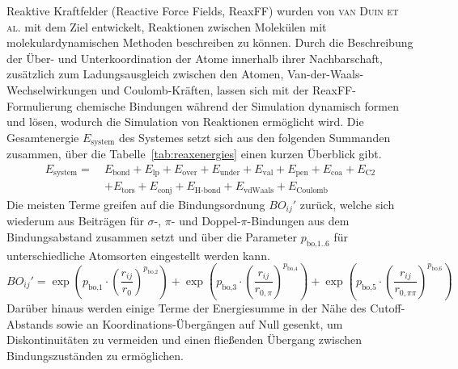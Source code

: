 Reaktive Kraftfelder (Reactive Force Fields, ReaxFF) wurden von \textsc{van Duin et al.}\cite{van_duin_reaxff:_2001} mit dem Ziel entwickelt, Reaktionen zwischen Molekülen mit molekulardynamischen Methoden beschreiben zu können.
Durch die Beschreibung der Über- und Unterkoordination der Atome innerhalb ihrer Nachbarschaft, zusätzlich zum Ladungsausgleich zwischen den Atomen, Van-der-Waals-Wechselwirkungen und Coulomb-Kräften, lassen sich mit der ReaxFF-Formulierung chemische Bindungen während der Simulation dynamisch formen und lösen, wodurch die Simulation von Reaktionen ermöglicht wird.
Die Gesamtenergie $E_\text{system}$ des Systemes setzt sich aus den folgenden Summanden zusammen, über die Tabelle~\ref{tab:reaxenergies} einen kurzen Überblick gibt.
\begin{align}
  \label{reaxformulation}
  E_\text{system} =~& E_\text{bond} + E_\text{lp} + E_\text{over} + E_\text{under} + E_\text{val} + E_\text{pen} + E_\text{coa} + E_\text{C2} \\
  \nonumber  & + E_\text{tors} + E_\text{conj} + E_\text{H-bond} + E_\text{vdWaals} + E_\text{Coulomb}
\end{align}
Die meisten Terme greifen auf die Bindungsordnung $BO_{ij}'$ zurück, welche sich wiederum aus Beiträgen für $\sigma$-, $\pi$- und Doppel-$\pi$-Bindungen aus dem Bindungsabstand zusammen setzt und über die Parameter $p_{\text{bo,1..6}}$ für unterschiedliche Atomsorten eingestellt werden kann.
\begin{equation}
  BO_{ij}' = \exp\left( p_{\text{bo,1}} \cdot \left( \frac{r_{ij}}{r_0} \right)^{p_\text{bo,2}} \right) + \exp\left( p_{\text{bo,3}} \cdot \left( \frac{r_{ij}}{r_{0,\pi}} \right)^{p_\text{bo,4}} \right) + \exp\left( p_{\text{bo,5}} \cdot \left( \frac{r_{ij}}{r_{0,\pi\pi}} \right)^{p_\text{bo,6}} \right)
\end{equation}
Darüber hinaus werden einige Terme der Energiesumme in der Nähe des Cutoff-Abstands sowie an Koordinations-Übergängen auf Null gesenkt, um Diskontinuitäten zu vermeiden und einen fließenden Übergang zwischen Bindungszuständen zu ermöglichen.

